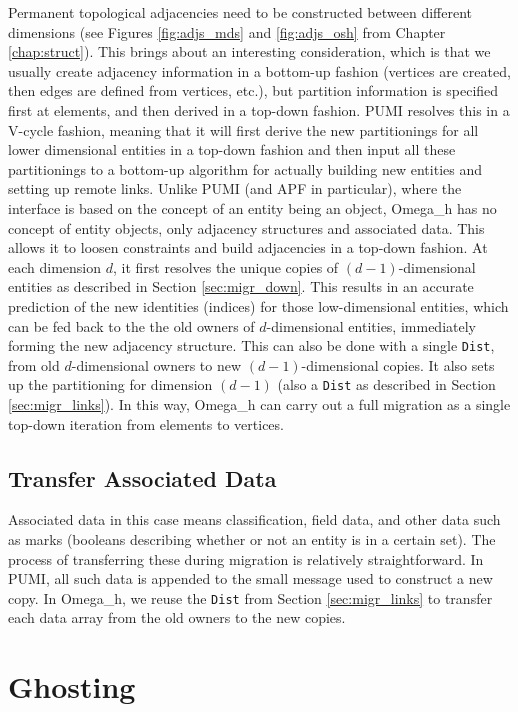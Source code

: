 Permanent topological adjacencies need to be constructed
between different dimensions (see Figures \ref{fig:adjs_mds} and
\ref{fig:adjs_osh} from Chapter \ref{chap:struct}).
This brings about an interesting consideration, which is that we
usually create adjacency information in a bottom-up fashion (vertices
are created, then edges are defined from vertices, etc.), but
partition information is specified first at elements, and then
derived in a top-down fashion.
PUMI resolves this in a V-cycle fashion, meaning that it will first
derive the new partitionings for all lower dimensional entities in a top-down
fashion and then input all these partitionings to a bottom-up algorithm
for actually building new entities and setting up remote links.
Unlike PUMI (and APF in particular), where the interface is based on the
concept of an entity being an object, Omega\_h has no concept of entity
objects, only adjacency structures and associated data.
This allows it to loosen constraints and build adjacencies in a top-down fashion.
At each dimension $d$, it first resolves the unique copies of
$(d-1)$-dimensional entities as described in Section \ref{sec:migr_down}.
This results in an accurate prediction of the new identities (indices)
for those low-dimensional entities, which can be fed back to the
the old owners of $d$-dimensional entities, immediately forming
the new adjacency structure.
This can also be done with a single \texttt{Dist}, from old
$d$-dimensional owners to new $(d-1)$-dimensional copies.
It also sets up the partitioning for dimension $(d-1)$
(also a \texttt{Dist} as described in Section \ref{sec:migr_links}).
In this way, Omega\_h can carry out a full migration as a single
top-down iteration from elements to vertices.

\subsection{Transfer Associated Data}

Associated data in this case means classification, field data,
and other data such as marks (booleans describing whether or not
an entity is in a certain set).
The process of transferring these during migration is relatively
straightforward.
In PUMI, all such data is appended to the small message used
to construct a new copy.
In Omega\_h, we reuse the \texttt{Dist} from Section \ref{sec:migr_links}
to transfer each data array from the old owners to the new copies.

\section{Ghosting}
\label{sec:ghost}

